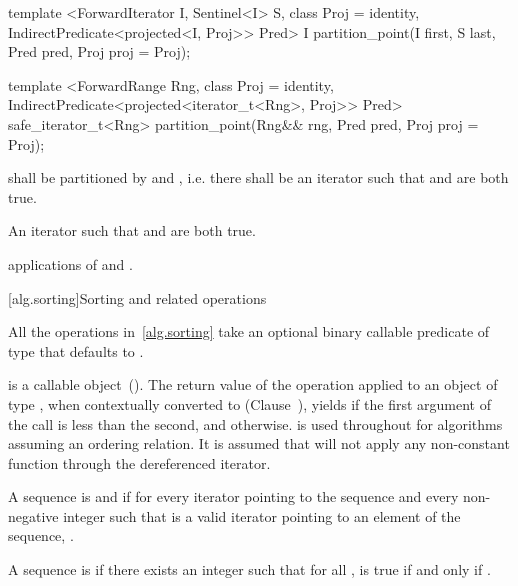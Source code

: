 %
\begin{itemdecl}
template <ForwardIterator I, Sentinel<I> S, class Proj = identity,
    IndirectPredicate<projected<I, Proj>> Pred>
  I partition_point(I first, S last, Pred pred, Proj proj = Proj{});

template <ForwardRange Rng, class Proj = identity,
    IndirectPredicate<projected<iterator_t<Rng>, Proj>> Pred>
  safe_iterator_t<Rng>
    partition_point(Rng&& rng, Pred pred, Proj proj = Proj{});
\end{itemdecl}

\begin{itemdescr}
\pnum
\requires {} shall be partitioned by  and , i.e.
there shall be an iterator  such that
 and 
are both true.

\pnum
\returns An iterator  such that  and
 are both true.

\pnum
\complexity {} applications of  and .
\end{itemdescr}


[alg.sorting]{Sorting and related operations}

\pnum
All the operations in~\ref{alg.sorting} take an optional binary callable predicate of type  that defaults to .

\pnum
{}
is a callable object~(). The return value of the  operation applied to
an object of type , when contextually converted to
 (Clause~),
yields  if the first argument of the call
is less than the second, and
otherwise.
is used throughout for algorithms assuming an ordering relation.
It is assumed that
will not apply any non-constant function through the dereferenced iterator.

\pnum
A sequence is
 and  if for every iterator
pointing to the sequence and every non-negative integer
such that
is a valid iterator pointing to an element of the sequence,
.

\pnum
A sequence
is
if there exists an integer
such that for all
,
is true if and only if
.

